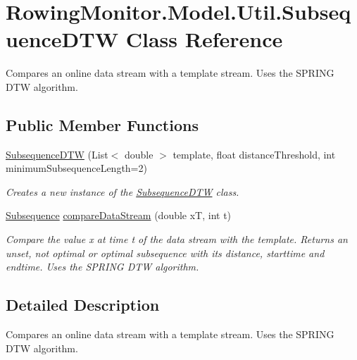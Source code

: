 \hypertarget{class_rowing_monitor_1_1_model_1_1_util_1_1_subsequence_d_t_w}{}\section{Rowing\+Monitor.\+Model.\+Util.\+Subsequence\+D\+TW Class Reference}
\label{class_rowing_monitor_1_1_model_1_1_util_1_1_subsequence_d_t_w}


Compares an online data stream with a template stream. Uses the S\+P\+R\+I\+NG D\+TW algorithm.  


\subsection*{Public Member Functions}
\begin{DoxyCompactItemize}
\item 
\hyperlink{class_rowing_monitor_1_1_model_1_1_util_1_1_subsequence_d_t_w_a16ee898f6e11aee3d1b3ccfb482cdddb}{Subsequence\+D\+TW} (List$<$ double $>$ template, float distance\+Threshold, int minimum\+Subsequence\+Length=2)
\begin{DoxyCompactList}\small\item\em Creates a new instance of the \hyperlink{class_rowing_monitor_1_1_model_1_1_util_1_1_subsequence_d_t_w}{Subsequence\+D\+TW} class. \end{DoxyCompactList}\item 
\hyperlink{struct_rowing_monitor_1_1_model_1_1_util_1_1_subsequence}{Subsequence} \hyperlink{class_rowing_monitor_1_1_model_1_1_util_1_1_subsequence_d_t_w_a2aa9afce49cbb11a86ee3e5791397416}{compare\+Data\+Stream} (double xT, int t)
\begin{DoxyCompactList}\small\item\em Compare the value x at time t of the data stream with the template. Returns an unset, not optimal or optimal subsequence with its distance, starttime and endtime. Uses the S\+P\+R\+I\+NG D\+TW algorithm. \end{DoxyCompactList}\end{DoxyCompactItemize}


\subsection{Detailed Description}
Compares an online data stream with a template stream. Uses the S\+P\+R\+I\+NG D\+TW algorithm. 



